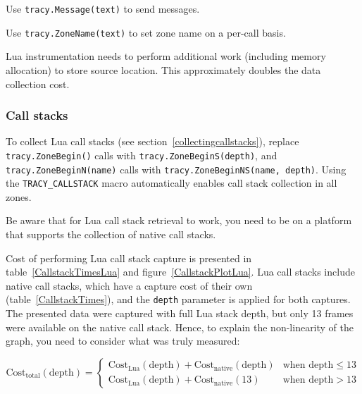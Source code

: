 \documentclass[hidelinks,titlepage,a4paper,twoside]{article}
\begin{document}
Use \texttt{tracy.Message(text)} to send messages.

Use \texttt{tracy.ZoneName(text)} to set zone name on a per-call basis.

Lua instrumentation needs to perform additional work (including memory allocation) to store source location. This approximately doubles the data collection cost.

\subsubsection{Call stacks}

To collect Lua call stacks (see section~\ref{collectingcallstacks}), replace \texttt{tracy.ZoneBegin()} calls with \texttt{tracy.ZoneBeginS(depth)}, and \texttt{tracy.ZoneBeginN(name)} calls with \texttt{tracy.ZoneBeginNS(name, depth)}. Using the \texttt{TRACY\_CALLSTACK} macro automatically enables call stack collection in all zones.

Be aware that for Lua call stack retrieval to work, you need to be on a platform that supports the collection of native call stacks.

Cost of performing Lua call stack capture is presented in table~\ref{CallstackTimesLua} and figure~\ref{CallstackPlotLua}. Lua call stacks include native call stacks, which have a capture cost of their own (table~\ref{CallstackTimes}), and the \texttt{depth} parameter is applied for both captures. The presented data were captured with full Lua stack depth, but only 13 frames were available on the native call stack. Hence, to explain the non-linearity of the graph, you need to consider what was truly measured:

\begin{displaymath}
\text{Cost}_{\text{total}}(\text{depth}) =
\begin{cases}
\text{Cost}_{\text{Lua}}(\text{depth}) + \text{Cost}_{\text{native}}(\text{depth}) & \text{when depth} \leq 13 \\
\text{Cost}_{\text{Lua}}(\text{depth}) + \text{Cost}_{\text{native}}(13) & \text{when depth} > 13
\end{cases}
\end{displaymath}
\end{document}
